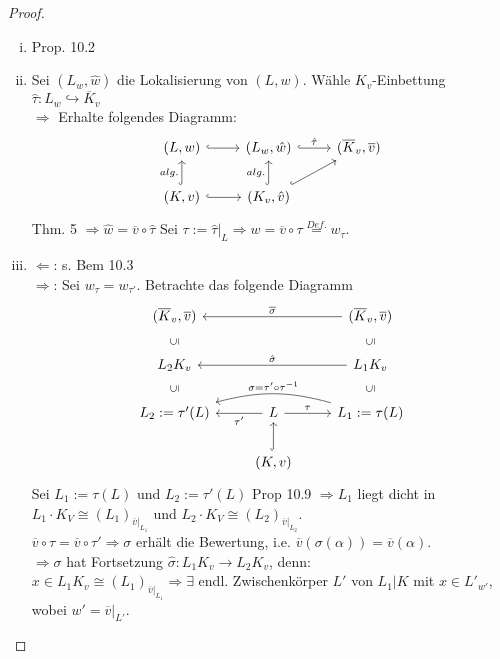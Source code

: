 \begin{proof}
\begin{enumerate}[i)]
\item Prop. 10.2
\item Sei $(L_w, \hat{w})$ die Lokalisierung von $(L,w)$. Wähle $K_v$-Einbettung $\hat{\tau}: L_w \hookrightarrow \overline{K}_v$\\
$\Rightarrow$ Erhalte folgendes Diagramm:
\[\begin{tikzcd}
(L,w) \arrow[r, hook] & (L_w, \hat{w}) \arrow[r, hook, "\hat{\tau}"] & (\overline{K}_v, \overline{v})\\
(K,v) \arrow[u, hook, "alg."] \arrow[r, hook] &(K_v, \hat{v}) \arrow[u, hook, "alg."] \arrow[ru, hook]
\end{tikzcd}\]
Thm. 5 $\Rightarrow \hat{w}= \overline{v} \circ \hat{\tau}$ Sei $\tau := \hat{\tau}|_L \Rightarrow w = \overline{v} \circ \tau \stackrel{Def.}{=} w_\tau$.
\item \glqq $\Leftarrow$\grqq : s. Bem 10.3\\
\glqq $\Rightarrow$\grqq : Sei $w_\tau = w_{\tau'}$. Betrachte das folgende Diagramm
\[
\begin{tikzcd}
(\overline{K}_v, \overline{v}) && (\overline{K}_v, \overline{v}) \arrow[ll,swap, "\overline{\sigma}"]\\
L_2 K_v \arrow[draw=none]{u}[auto=false, sloped]{\subseteq} && L_1 K_v \arrow[draw=none]{u}[auto=false, sloped]{\subseteq} \arrow[ll,swap, "\hat{\sigma}"]\\
L_2:=\tau'(L) \arrow[draw=none]{u}[auto=false, sloped]{\subseteq} & L \arrow[l, "\tau'"]\arrow[r, "\tau"] & L_1:=\tau(L) \arrow[draw=none]{u}[auto=false, sloped]{\subseteq} \arrow[ll, bend right=15, swap, "\sigma=\tau' \circ \tau^{-1}"]\\
&(K,v) \arrow[u, hook]&
\end{tikzcd}
\]
Sei $L_1 := \tau(L)$ und $L_2:=\tau'(L)$ Prop 10.9 $\Rightarrow L_1$ liegt dicht in $L_1 \cdot K_V \cong (L_1)_{\overline{v}|_{L_1}}$ und $L_2 \cdot K_V \cong (L_2)_{\overline{v}|_{L_2}}$.\\
$\overline{v}  \circ \tau = \overline{v} \circ \tau' \Rightarrow \sigma$ erhält die Bewertung, i.e. $\overline{v}(\sigma(\alpha)) = \overline{v}(\alpha)$.\\
$\Rightarrow \sigma$ hat Fortsetzung $\hat{\sigma}: L_1 K_v \to L_2 K_v$, denn:\\
$x \in L_1 K_v \cong (L_1)_{\overline{v}|_{L_1}} \Rightarrow \exists
 $ endl. Zwischenkörper $L'$ von $L_1 |K$ mit $x \in L'_{w'}$, wobei $w'=\overline{v}|_{L'}$.\\

\end{enumerate}
\end{proof}
